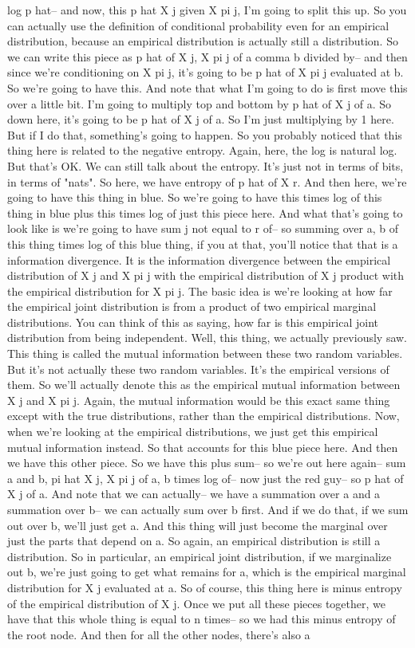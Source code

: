 log p hat-- and now, this p hat X j given X pi j, I'm going to split this up. So you can actually use the definition of conditional probability even for an empirical distribution, because an empirical distribution is actually still a distribution. So we can write this piece as p hat of X j, X pi j of a comma b divided by-- and then since we're conditioning on X pi j, it's going to be p hat of X pi j evaluated at b. So we're going to have this. And note that what I'm going to do is first move this over a little bit. I'm going to multiply top and bottom by p hat of X j of a. So down here, it's going to be p hat of X j of a. So I'm just multiplying by 1 here. But if I do that, something's going to happen. So you probably noticed that this thing here is related to the negative entropy. Again, here, the log is natural log. But that's OK. We can still talk about the entropy. It's just not in terms of bits, in terms of "nats". So here, we have entropy of p hat of X r. And then here, we're going to have this thing in blue. So we're going to have this times log of this thing in blue plus this times log of just this piece here. And what that's going to look like is we're going to have sum j not equal to r of-- so summing over a, b of this thing times log of this blue thing, if you at that, you'll notice that that is a information divergence. It is the information divergence between the empirical distribution of X j and X pi j with the empirical distribution of X j product with the empirical distribution for X pi j. The basic idea is we're looking at how far the empirical joint distribution is from a product of two empirical marginal distributions. You can think of this as saying, how far is this empirical joint distribution from being independent. Well, this thing, we actually previously saw. This thing is called the mutual information between these two random variables. But it's not actually these two random variables. It's the empirical versions of them. So we'll actually denote this as the empirical mutual information between X j and X pi j. Again, the mutual information would be this exact same thing except with the true distributions, rather than the empirical distributions. Now, when we're looking at the empirical distributions, we just get this empirical mutual information instead. So that accounts for this blue piece here. And then we have this other piece. So we have this plus sum-- so we're out here again-- sum a and b, pi hat X j, X pi j of a, b times log of-- now just the red guy-- so p hat of X j of a. And note that we can actually-- we have a summation over a and a summation over b-- we can actually sum over b first. And if we do that, if we sum out over b, we'll just get a. And this thing will just become the marginal over just the parts that depend on a. So again, an empirical distribution is still a distribution. So in particular, an empirical joint distribution, if we marginalize out b, we're just going to get what remains for a, which is the empirical marginal distribution for X j evaluated at a. So of course, this thing here is minus entropy of the empirical distribution of X j. Once we put all these pieces together, we have that this whole thing is equal to n times-- so we had this minus entropy of the root node. And then for all the other nodes, there's also a 